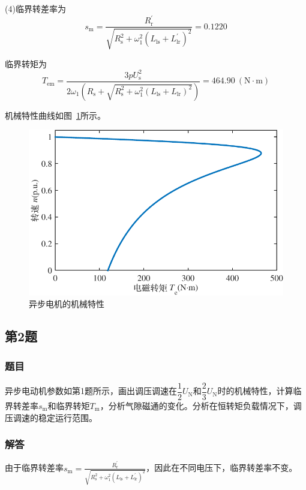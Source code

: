 \documentclass[12pt, a4paper, UTF8, fontset=adobe, oneside]{ctexbook} %
\begin{document}
(4)临界转差率为
\begin{equation}
  s_{\mathrm{m}} = \frac{R_{\mathrm{r}}^{'}}{\sqrt{R_{\mathrm{s}}^2+\omega_1^2(L_{\mathrm{ls}}+L_{\mathrm{lr}}^{'})^2}}=0.1220
\end{equation}

临界转矩为
\begin{equation}
  T_{\mathrm{em}}=\dfrac{3pU_{\mathrm{s}}^2}{2\omega_1(R_{\mathrm{s}}+\sqrt{R_{\mathrm{s}}^2+\omega_1^2(L_{\mathrm{ls}}+L_{\mathrm{lr}})^2})} = 464.90\ (\mathrm{N·m})
\end{equation}

机械特性曲线如图~\ref{Fig:MechCurve}所示。

\begin{figure}[htbp]
  \centering
  \includegraphics[width=12.557cm]{Fig_T_s.pdf} %
  \caption{异步电机的机械特性}\label{Fig:MechCurve}
\end{figure}

\subsection{第2题}
\subsubsection{题目}
异步电动机参数如第1题所示，画出调压调速在$\dfrac{1}{2}U_{\mathrm{N}}$和$\dfrac{2}{3}U_{\mathrm{N}}$时的机械特性，计算临界转差率$s_{\mathrm{m}}$和临界转矩$T_{\mathrm{m}}$，分析气隙磁通的变化。分析在恒转矩负载情况下，调压调速的稳定运行范围。
\subsubsection{解答}
由于临界转差率$s_{\mathrm{m}} = \frac{R_{\mathrm{r}}^{'}}{\sqrt{R_{\mathrm{s}}^2+\omega_1^2(L_{\mathrm{ls}}+L_{\mathrm{lr}}^{'})^2}}$，因此在不同电压下，临界转差率不变。
\end{document}
